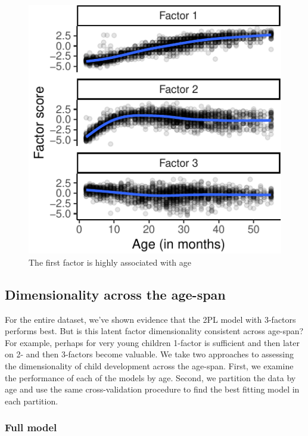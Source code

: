 \documentclass[10pt, letterpaper]{article}
\newenvironment{CodeChunk}{}{}
\begin{document}
\begin{CodeChunk}
\begin{figure}[tb]
\includegraphics{figs/factorscores-1} \caption[The first factor is highly associated with age]{The first factor is highly associated with age}\label{fig:factorscores}
\end{figure}
\end{CodeChunk}

\hypertarget{dimensionality-across-the-age-span}{%
\subsection{Dimensionality across the
age-span}\label{dimensionality-across-the-age-span}}

For the entire dataset, we've shown evidence that the 2PL model with
3-factors performs best. But is this latent factor dimensionality
consistent across age-span? For example, perhaps for very young children
1-factor is sufficient and then later on 2- and then 3-factors become
valuable. We take two approaches to assessing the dimensionality of
child development across the age-span. First, we examine the performance
of each of the models by age. Second, we partition the data by age and
use the same cross-validation procedure to find the best fitting model
in each partition.

\vskip 0.1in

\hypertarget{full}{%
\subsubsection{Full model}\label{full}}
\end{document}
